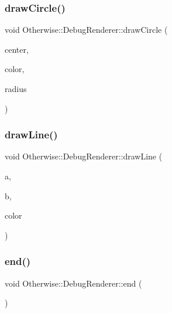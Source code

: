 \mbox{\label{class_otherwise_1_1_debug_renderer_afc8de4f52bece8d40e3e114a1cf1caab}} 
\subsubsection{\texorpdfstring{draw\+Circle()}{drawCircle()}}
{\footnotesize\ttfamily void Otherwise\+::\+Debug\+Renderer\+::draw\+Circle (\begin{DoxyParamCaption}\item[{const glm\+::vec2 \&}]{center,  }\item[{const \hyperlink{struct_otherwise_1_1_color_r_g_b_a8}{Color\+R\+G\+B\+A8} \&}]{color,  }\item[{float}]{radius }\end{DoxyParamCaption})}

\mbox{\label{class_otherwise_1_1_debug_renderer_a6d42ed7172dcbc216b7891de6b4de487}} 
\subsubsection{\texorpdfstring{draw\+Line()}{drawLine()}}
{\footnotesize\ttfamily void Otherwise\+::\+Debug\+Renderer\+::draw\+Line (\begin{DoxyParamCaption}\item[{const glm\+::vec2 \&}]{a,  }\item[{const glm\+::vec2 \&}]{b,  }\item[{const \hyperlink{struct_otherwise_1_1_color_r_g_b_a8}{Color\+R\+G\+B\+A8} \&}]{color }\end{DoxyParamCaption})}

\mbox{\label{class_otherwise_1_1_debug_renderer_afbd9d155a5fb89e6254f11d918f37eef}} 
\subsubsection{\texorpdfstring{end()}{end()}}
{\footnotesize\ttfamily void Otherwise\+::\+Debug\+Renderer\+::end (\begin{DoxyParamCaption}{ }\end{DoxyParamCaption})}

